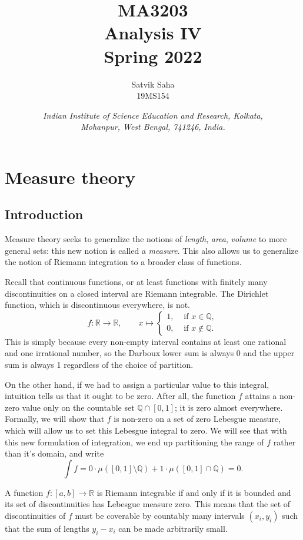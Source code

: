 \documentclass[11pt]{article}
\title{
    \Large\textsc{MA3203} \\
    \Huge \textbf{Analysis IV} \\
    \vspace{5pt}
    \Large{Spring 2022}
}
\author{
    \large Satvik Saha
    \\\textsc{\small 19MS154}
}
\date{\normalsize
    \textit{Indian Institute of Science Education and Research, Kolkata, \\
    Mohanpur, West Bengal, 741246, India.} \\
}
\newcommand{\R}{\mathbb{R}}
\newcommand{\Q}{\mathbb{Q}}
\theoremstyle{definition}
\theoremstyle{remark}
\numberwithin{equation}{section}
\begin{document}
    \maketitle

    \tableofcontents

    \section{Measure theory}

    \subsection{Introduction}
    Measure theory seeks to generalize the notions of \emph{length}, \emph{area},
    \emph{volume} to more general sets: this new notion is called a \emph{measure}.
    This also allows us to generalize the notion of Riemann integration to a broader
    class of functions.

    Recall that continuous functions, or at least functions with finitely many
    discontinuities on a closed interval are Riemann integrable. The Dirichlet
    function, which is discontinuous everywhere, is not. \[
        f\colon \R \to \R, \qquad x \mapsto \begin{cases}
            1, &\text{ if } x \in \Q, \\
            0, &\text{ if } x \notin \Q.
        \end{cases}
    \] This is simply because every non-empty interval contains at least one rational
    and one irrational number, so the Darboux lower sum is always 0 and the upper sum
    is always 1 regardless of the choice of partition.

    On the other hand, if we had to assign a particular value to this integral,
    intuition tells us that it ought to be zero. After all, the function $f$ attains
    a non-zero value only on the countable set $\Q \cap [0, 1]$; it is zero almost
    everywhere. Formally, we will show that $f$ is non-zero on a set of zero
    Lebesgue measure, which will allow us to set this Lebesgue integral to zero. We
    will see that with this new formulation of integration, we end up partitioning
    the range of $f$ rather than it's domain, and write \[
        \int f = 0\cdot \mu([0, 1]\setminus \Q) + 1\cdot \mu([0, 1] \cap \Q) = 0.
    \] 

    \begin{theorem}
        A function $f\colon [a, b] \to \R$ is Riemann integrable if and only if it is
        bounded and its set of discontinuities has Lebesgue measure zero. This means
        that the set of discontinuities of $f$ must be coverable by countably many
        intervals $(x_i, y_i)$ such that the sum of lengths $y_i - x_i$ can be made
        arbitrarily small.
    \end{theorem}
    
\end{document}

